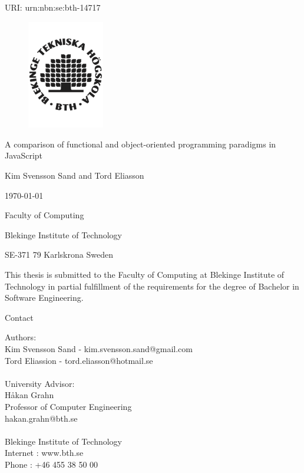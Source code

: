 \documentclass {article}
\begin{document}
\begin{titlepage}
	\begin{flushleft}
	URI: urn:nbn:se:bth-14717
	\end{flushleft}
	\centering
\begin{figure}[H]
\centering
	\includegraphics[width=0.3\textwidth]{bth-logo} \par
\end{figure}
	{\LARGE A comparison of functional and object-oriented programming paradigms in JavaScript \par}
	\vspace{1cm}
{\large Kim Svensson Sand and Tord Eliasson \par}
{\large \today \par}
	\vfill
	{\normalsize Faculty of Computing \par}
	{\normalsize Blekinge Institute of Technology \par}
	{\normalsize SE-371 79 Karlskrona Sweden \par}
\end{titlepage}
\newpage
This thesis is submitted to the Faculty of Computing at Blekinge Institute of Technology in partial fulfillment of the requirements for the degree of Bachelor in Software Engineering. 
\vfill
{\large Contact \par}
Authors: \\
Kim Svensson Sand - kim.svensson.sand@gmail.com \\
Tord Eliassion - tord.eliasson@hotmail.se \\
\\
University Advisor: \\
H{\aa}kan Grahn \\
Professor of Computer Engineering \\
hakan.grahn@bth.se \\
\\
Blekinge Institute of Technology \\
Internet : www.bth.se \\
Phone : +46 455 38 50 00 \\ 
\newpage
\end{document}
